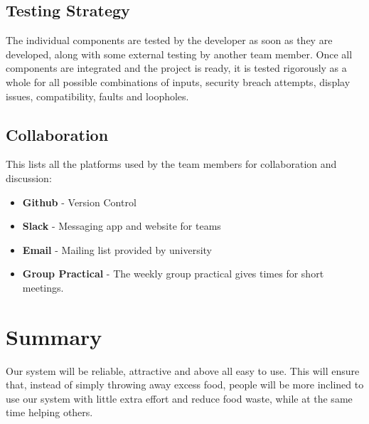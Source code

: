 \documentclass[12pt]{article}
\begin{document}
\subsection{Testing Strategy}

The individual components are tested by the developer as soon as they are developed, along with some external testing by another team member. Once all components are integrated and the project is ready, it is tested rigorously as a whole for all possible combinations of inputs, security breach attempts, display issues, compatibility, faults and loopholes.

\subsection{Collaboration}

This lists all the platforms used by the team members for collaboration and discussion:

\begin{itemize}

\item \textbf{Github} - Version Control 


\item \textbf{Slack} - Messaging app and website for teams


\item \textbf{Email} - Mailing list provided by university


\item \textbf{Group Practical} - The weekly group practical gives times for short meetings.

\end{itemize}

\section{Summary}

Our system will be reliable, attractive and above all easy to use. This will ensure that, instead of simply throwing away excess food, people will be more inclined to use our system with little extra effort and reduce food waste, while at the same time helping others. 
\end{document}
